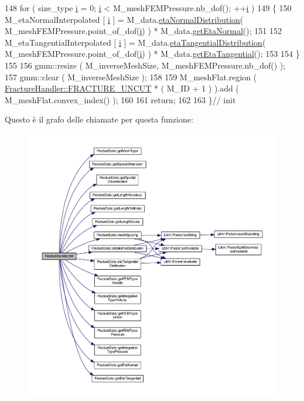 \begin{DoxyCode}
148     \textcolor{keywordflow}{for} ( size\_type \hyperlink{matrici_8m_a6f6ccfcf58b31cb6412107d9d5281426}{i} = 0; \hyperlink{matrici_8m_a6f6ccfcf58b31cb6412107d9d5281426}{i} < M\_meshFEMPressure.nb\_dof(); ++\hyperlink{matrici_8m_a6f6ccfcf58b31cb6412107d9d5281426}{i} )
149     \{
150         M\_etaNormalInterpolated [ \hyperlink{matrici_8m_a6f6ccfcf58b31cb6412107d9d5281426}{i} ] = M\_data.\hyperlink{classFractureData_a0aaeeb3d9eedd46175759cd6b9536484}{etaNormalDistribution}( 
      M\_meshFEMPressure.point\_of\_dof(\hyperlink{matrici_8m_a6f6ccfcf58b31cb6412107d9d5281426}{i}) ) * M\_data.\hyperlink{classFractureData_a9acc76c77282d4b5d0cdca18c2b1b9ea}{getEtaNormal}();
151 
152         M\_etaTangentialInterpolated [ \hyperlink{matrici_8m_a6f6ccfcf58b31cb6412107d9d5281426}{i} ] = M\_data.\hyperlink{classFractureData_a0f989b64832a1f0fc77632c6803f102c}{etaTangentialDistribution}( 
      M\_meshFEMPressure.point\_of\_dof(\hyperlink{matrici_8m_a6f6ccfcf58b31cb6412107d9d5281426}{i}) ) * M\_data.\hyperlink{classFractureData_a7378053b4009825b4a2957484cb2a5e8}{getEtaTangential}();
153 
154     \}
155 
156     gmm::resize ( M\_inverseMeshSize, M\_meshFEMPressure.nb\_dof() );
157     gmm::clear ( M\_inverseMeshSize );
158 
159     M\_meshFlat.region ( \hyperlink{classFractureHandler_a495ad4fc72d0c47c8f0424842f1153aaaa992cc3ad024a030ecd798dc319c95ac}{FractureHandler::FRACTURE\_UNCUT} * ( M\_ID + 1 ) ).add
       ( M\_meshFlat.convex\_index() );
160 
161     \textcolor{keywordflow}{return};
162     
163 \}\textcolor{comment}{// init}
\end{DoxyCode}


Questo è il grafo delle chiamate per questa funzione\-:\nopagebreak
\begin{figure}[H]
\begin{center}
\leavevmode
\includegraphics[width=350pt]{classFractureHandler_aa28ce054ba2a2679214956c71f8cf1e0_cgraph}
\end{center}
\end{figure}


